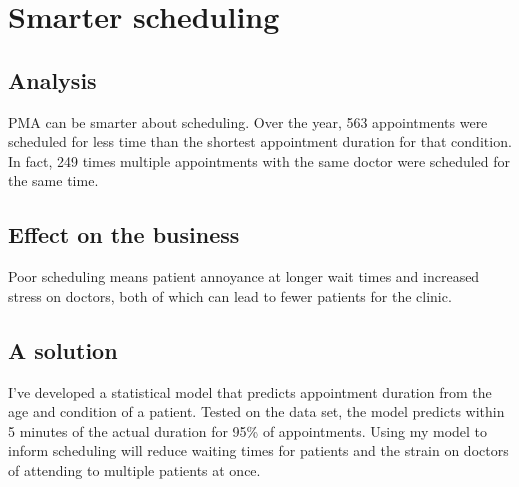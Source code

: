 \section{Smarter scheduling}
\subsection{Analysis}
PMA can be smarter about scheduling. Over the year, 563 appointments were scheduled for less time than the shortest appointment duration for that condition. In fact, 249 times multiple appointments with the same doctor were scheduled for the same time.

\subsection{Effect on the business} Poor scheduling means patient annoyance at longer wait times and increased stress on doctors, both of which can lead to fewer patients for the clinic.

\begin{comment}
{\tiny
\begin{tabular}{lll}
\toprule
condition & min appointment time & \# appointments scheduled for less time than the minimum\\
\midrule
1 & 1 & 1 \\
\bottomrule
\end{tabular}
}
\end{comment}

\subsection{A solution} I've developed a statistical model that predicts appointment duration from the age and condition of a patient. Tested on the data set, the model predicts within 5 minutes of the actual duration for 95\% of appointments. Using my model to inform scheduling will reduce waiting times for patients and the strain on doctors of attending to multiple patients at once.

\begin{figure}[h]
\centering
{}
\label{aac}
\end{figure}

\begin{comment}
\subsection{Questions}
\end{comment}
